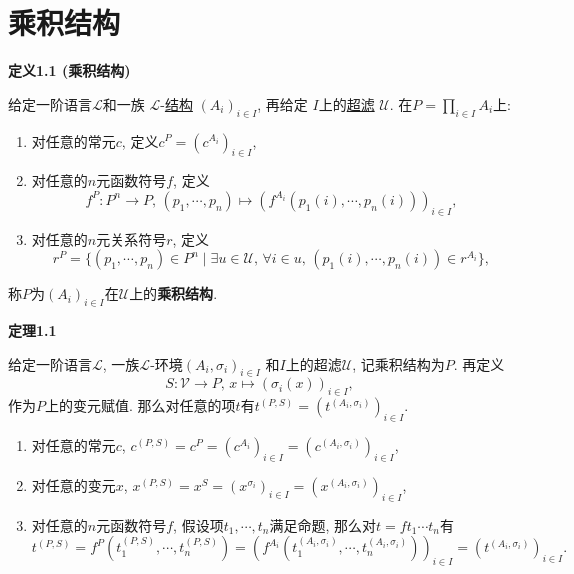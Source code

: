 


\setlength{\abovedisplayskip}{1pt}
\setlength{\belowdisplayskip}{1pt}

\section{乘积结构}

\hypertarget{sec:定义1.1}{}
\noindent\textbf{定义1.1 (乘积结构)}

给定一阶语言$\mathcal{L}$和一族
$\mathcal{L}$-\href{../01 一阶语言的结构/01 一阶语言的结构#nameddest=sec:定义1.1}
{结构} $(A_i)_{i\in I}$, 再给定
$I$上的\href{../../../01 基础集合论/06 滤子/03 超滤#nameddest=sec:定义1.1}{超滤}
$\mathcal{U}$.
在$\displaystyle P=\prod_{i\in I}A_i$上:
\begin{enumerate}
    \item 对任意的常元$c$, 定义$c^P=(c^{A_i})_{i\in I}$,
    \item 对任意的$n$元函数符号$f$, 定义
    \[
        f^P:P^n\to P,\,
        (p_1,\cdots,p_n)\mapsto(f^{A_i}(p_1(i),\cdots,p_n(i)))_{i\in I},
    \]
    \item 对任意的$n$元关系符号$r$, 定义
    \[
        r^P=\{(p_1,\cdots,p_n)\in P^n\mid\exists u\in\mathcal{U},\,
        \forall i\in u,\,(p_1(i),\cdots,p_n(i))\in r^{A_i}\},
    \]
\end{enumerate}
称$P$为$(A_i)_{i\in I}$在$\mathcal{U}$上的\textbf{乘积结构}.

\vspace{10pt}

\hypertarget{sec:定理1.1}{}
\noindent\textbf{定理1.1}

给定一阶语言$\mathcal{L}$, 一族$\mathcal{L}$-环境$(A_i,\sigma_i)_{i\in I}$
和$I$上的超滤$\mathcal{U}$, 记乘积结构为$P$. 再定义
\[
    S:\mathcal{V}\to P,\,x\mapsto(\sigma_i(x))_{i\in I},
\]
作为$P$上的变元赋值. 那么对任意的项$t$有$t^{(P,S)}=(t^{(A_i,\sigma_i)})_{i\in I}$.


\begin{enumerate}
    \item 对任意的常元$c$,
    $c^{(P,S)}=c^P=(c^{A_i})_{i\in I}=(c^{(A_i,\sigma_i)})_{i\in I}$,
    \item 对任意的变元$x$,
    $x^{(P,S)}=x^S=(x^{\sigma_i})_{i\in I}=(x^{(A_i,\sigma_i)})_{i\in I}$,
    \item 对任意的$n$元函数符号$f$, 假设项$t_1,\cdots,t_n$满足命题,
    那么对$t=ft_1\cdots t_n$有
    \begin{equation*}
        t^{(P,S)}=f^P(t_1^{(P,S)},\cdots,t_n^{(P,S)})
        =(f^{A_i}(t_1^{(A_i,\sigma_i)},\cdots,t_n^{(A_i,\sigma_i)}))_{i\in I}
        =(t^{(A_i,\sigma_i)})_{i\in I}.
    \tag*{\qedsymbol}\end{equation*}
\end{enumerate}





